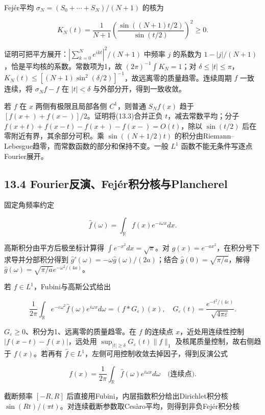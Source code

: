 \documentclass[11pt,a4paper]{article}
\begin{document}
Fejér平均 \(\sigma_N=(S_0+\cdots+S_N)/(N+1)\) 的核为

\[
K_N(t)=\frac1{N+1}\left(\frac{\sin((N+1)t/2)}{\sin(t/2)}\right)^2\ge0.\tag{13.4}
\]

证明可把平方展开：\(|\sum_{k=0}^Ne^{ikt}|^2/(N+1)\) 中频率 \(j\)
的系数为 \(1-|j|/(N+1)\)，恰是平均核的系数。常数项为1，故
\((2\pi)^{-1}\int K_N=1\)；对
\(\delta\le|t|\le\pi\)，\(K_N(t)\le[(N+1)\sin^2(\delta/2)]^{-1}\)，故远离零的质量趋零。连续周期
\(f\) 一致连续，将 \(\sigma_Nf-f\) 在 \(|t|<\delta\)
与外部分开，得到一致收敛。

若 \(f\) 在 \(x\) 两侧有极限且局部各侧 \(C^1\)，则普通 \(S_Nf(x)\) 趋于
\([f(x+)+f(x-)]/2\)。证明将(13.3)合并正负 \(t\)，减去常数平均；分子
\(f(x+t)+f(x-t)-f(x+)-f(x-)=O(t)\)，除以 \(\sin(t/2)\)
后在零附近有界，其余部分可积。乘 \(\sin((N+1/2)t)\)
的积分由Riemann--Lebesgue趋零，而常数函数的部分和保持不变。一般 \(L^1\)
函数不能无条件写逐点Fourier展开。

\subsection{13.4
Fourier反演、Fejér积分核与Plancherel}\label{fourierux53cdux6f14fejuxe9rux79efux5206ux6838ux4e0eplancherel}

固定角频率约定

\[
\widehat f(\omega)=\int_{\mathbb R}f(x)e^{-i\omega x}dx.
\]

高斯积分由平方后极坐标计算得 \(\int e^{-x^2}dx=\sqrt\pi\)。对
\(g(x)=e^{-ax^2}\)，在积分号下求导并分部积分得到
\(\widehat g'(\omega)=-\omega\widehat g(\omega)/(2a)\)；结合
\(\widehat g(0)=\sqrt{\pi/a}\)，解得
\(\widehat g(\omega)=\sqrt{\pi/a}e^{-\omega^2/(4a)}\)。

若 \(f\in L^1\)，Fubini与高斯公式给出

\[
\frac1{2\pi}\int_{\mathbb R}e^{-\varepsilon\omega^2}\widehat f(\omega)e^{i\omega x}d\omega
=(f*G_\varepsilon)(x),\quad
G_\varepsilon(t)=\frac{e^{-t^2/(4\varepsilon)}}{\sqrt{4\pi\varepsilon}}.\tag{13.5}
\]

\(G_\varepsilon\ge0\)、积分为1、远离零的质量趋零。在 \(f\) 的连续点
\(x\)，近处用连续性控制 \(|f(x-t)-f(x)|\)，远处用
\(\sup_{|t|\ge\delta}G_\varepsilon(t)\|f\|_1\)
及核尾质量控制，故右侧趋于 \(f(x)\)。若再有
\(\widehat f\in L^1\)，左侧可用控制收敛去掉因子，得到反演公式

\[
f(x)=\frac1{2\pi}\int_{\mathbb R}\widehat f(\omega)e^{i\omega x}d\omega\quad\text{(连续点)}.\tag{13.6}
\]

截断频率 \([-R,R]\) 后直接用Fubini，内层指数积分给出Dirichlet积分核
\(\sin(Rt)/(\pi t)\)。对连续截断参数取Cesàro平均，则得到非负Fejér积分核
\end{document}
